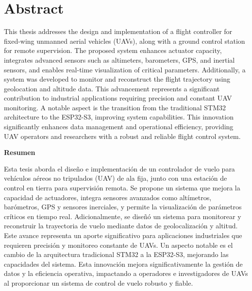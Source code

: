   \section{Abstract}

  This thesis addresses the design and implementation of a flight controller for fixed-wing unmanned aerial vehicles (UAVs), along with a ground control station for remote supervision. The proposed system enhances actuator capacity, integrates advanced sensors such as altimeters, barometers, GPS, and inertial sensors, and enables real-time visualization of critical parameters. Additionally, a system was developed to monitor and reconstruct the flight trajectory using geolocation and altitude data. This advancement represents a significant contribution to industrial applications requiring precision and constant UAV monitoring. A notable aspect is the transition from the traditional STM32 architecture to the ESP32-S3, improving system capabilities. This innovation significantly enhances data management and operational efficiency, providing UAV operators and researchers with a robust and reliable flight control system.\vspace{30 px}


\begin{center}
    \textbf{\LARGE{Resumen}} 
\end{center}

\vspace{10 px}

Esta tesis aborda el diseño e implementación de un controlador de vuelo para vehículos aéreos no tripulados (UAV) de ala fija, junto con una estación de control en tierra para supervisión remota. Se propone un sistema que mejora la capacidad de actuadores, integra sensores avanzados como altímetros, barómetros, GPS y sensores inerciales, y permite la visualización de parámetros críticos en tiempo real. Adicionalmente, se diseñó un sistema para monitorear y reconstruir la trayectoria de vuelo mediante datos de geolocalización y altitud. Este avance representa un aporte significativo para aplicaciones industriales que requieren precisión y monitoreo constante de UAVs. Un aspecto notable es el cambio de la arquitectura tradicional STM32 a la ESP32-S3, mejorando las capacidades del sistema. Esta innovación mejora significativamente la gestión de datos y la eficiencia operativa, impactando a operadores e investigadores de UAVs al proporcionar un sistema de control de vuelo robusto y fiable.